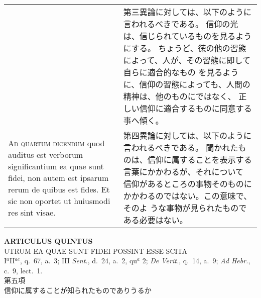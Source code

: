 \documentclass[10pt]{jsarticle} %
\begin{document}
\begin{longtable}{p{21em}p{21em}}
&

第三異論に対しては、以下のように言われるべきである。
信仰の光は、信じられているものを見るようにする。
ちょうど、徳の他の習態によって、人が、その習態に即して自らに適合的なもの
 を見るように、信仰の習態によっても、人間の精神は、他のものにではなく、
 正しい信仰に適合するものに同意する事へ傾く。

\\


{\scshape Ad quartum dicendum} quod auditus est verborum significantium
ea quae sunt fidei, non autem est ipsarum rerum de quibus est fides. Et
sic non oportet ut huiusmodi res sint visae.

&

第四異論に対しては、以下のように言われるべきである。
聞かれたものは、信仰に属することを表示する言葉にかかわるが、それについて
 信仰があるところの事物そのものにかかわるのではない。この意味で、そのよ
 うな事物が見られたものである必要はない。



\\


\end{longtable}
\newpage

\begin{center}
 {\Large {\bf ARTICULUS QUINTUS}}\\
 {\large UTRUM EA QUAE SUNT FIDEI POSSINT ESSE SCITA}\\
 {\footnotesize I$^a$II$^{ae}$, q.~67, a.~3; III {\itshape Sent.}, d.~24,
 a.~2, qu$^a$ 2; {\itshape De Verit.}, q.~14, a.~9; {\itshape Ad Hebr.},
 c.~9, lect.~1.}\\
 {\Large 第五項\\信仰に属することが知られたものでありうるか}
\end{center}
\end{document}
